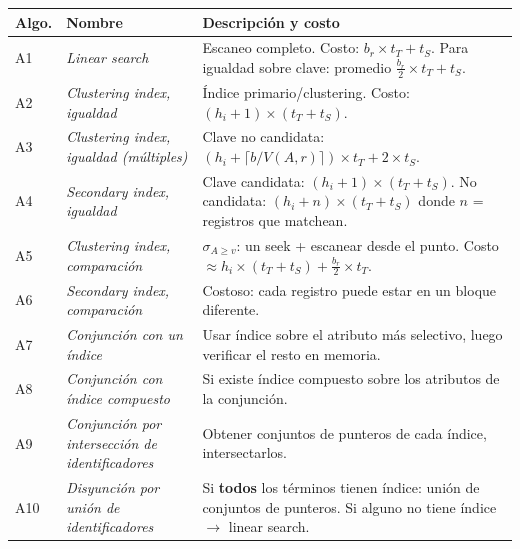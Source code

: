 \documentclass[11pt, a4paper]{article}
\begin{document}
\begin{tabularx}{\textwidth}{@{}llX@{}}
	\toprule
	\textbf{Algo.} & \textbf{Nombre}                                         & \textbf{Descripción y costo}                                                                                                         \\
	\midrule
	A1             & \textit{Linear search}                                  & Escaneo completo. Costo: $b_r \times t_T + t_S$. Para igualdad sobre clave: promedio $\frac{b_r}{2} \times t_T + t_S$.               \\
	A2             & \textit{Clustering index, igualdad}                     & Índice primario/clustering. Costo: $(h_i + 1) \times (t_T + t_S)$.                                                                   \\
	A3             & \textit{Clustering index, igualdad (múltiples)}         & Clave no candidata: $(h_i + \lceil b/V(A,r) \rceil) \times t_T + 2 \times t_S$.                                                      \\
	A4             & \textit{Secondary index, igualdad}                      & Clave candidata: $(h_i + 1) \times (t_T + t_S)$. No candidata: $(h_i + n) \times (t_T + t_S)$ donde $n$ = registros que matchean.    \\
	\midrule
	A5             & \textit{Clustering index, comparación}                  & $\sigma_{A \geq v}$: un seek + escanear desde el punto. Costo $\approx h_i \times (t_T + t_S) + \frac{b_r}{2} \times t_T$.           \\
	A6             & \textit{Secondary index, comparación}                   & Costoso: cada registro puede estar en un bloque diferente.                                                                           \\
	\midrule
	A7             & \textit{Conjunción con un índice}                       & Usar índice sobre el atributo más selectivo, luego verificar el resto en memoria.                                                    \\
	A8             & \textit{Conjunción con índice compuesto}                & Si existe índice compuesto sobre los atributos de la conjunción.                                                                     \\
	A9             & \textit{Conjunción por intersección de identificadores} & Obtener conjuntos de punteros de cada índice, intersectarlos.                                                                        \\
	A10            & \textit{Disyunción por unión de identificadores}        & Si \textbf{todos} los términos tienen índice: unión de conjuntos de punteros. Si alguno no tiene índice $\rightarrow$ linear search. \\
	\bottomrule
\end{tabularx}
\end{document}
